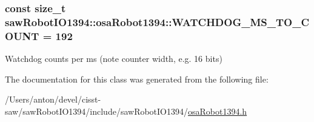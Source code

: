 \subsubsection[{W\+A\+T\+C\+H\+D\+O\+G\+\_\+\+M\+S\+\_\+\+T\+O\+\_\+\+C\+O\+U\+N\+T}]{\setlength{\rightskip}{0pt plus 5cm}const size\+\_\+t saw\+Robot\+I\+O1394\+::osa\+Robot1394\+::\+W\+A\+T\+C\+H\+D\+O\+G\+\_\+\+M\+S\+\_\+\+T\+O\+\_\+\+C\+O\+U\+N\+T = 192\hspace{0.3cm}{\ttfamily [static]}}\label{classsaw_robot_i_o1394_1_1osa_robot1394_a3d4cfdd12c7987826fb43028bd06e4b5}


Watchdog counts per ms (note counter width, e.\+g. 16 bits) 



The documentation for this class was generated from the following file\+:\begin{DoxyCompactItemize}
\item 
/\+Users/anton/devel/cisst-\/saw/saw\+Robot\+I\+O1394/include/saw\+Robot\+I\+O1394/\hyperlink{osa_robot1394_8h}{osa\+Robot1394.\+h}\end{DoxyCompactItemize}
